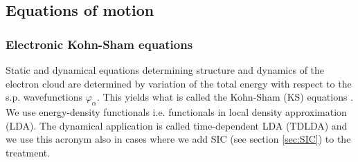 \documentclass[final,1p]{elsarticle}
\begin{document}
\subsection{Equations of motion}
\label{sec:mf}

\subsubsection{Electronic Kohn-Sham equations}

Static and dynamical equations determining structure and dynamics of
the electron cloud are determined by variation of the total energy
with respect to the s.p. wavefunctions $\varphi_\alpha$.  This yields
what is called the Kohn-Sham (KS) equations \cite{Koh65}.  We use
energy-density functionals \cite{Per92,Gun76} i.e. functionals in
local density approximation (LDA).  The dynamical application is
called time-dependent LDA (TDLDA) and we use this acronym also in
cases where we add SIC (see section \ref{sec:SIC}) to the treatment.
\end{document}
